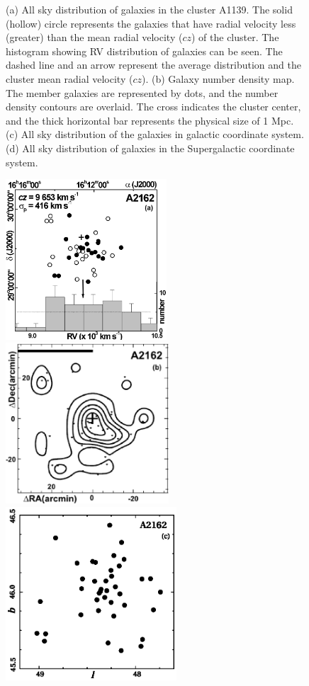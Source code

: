\begin{figure}[H]
   \caption{(a) All sky distribution of galaxies in the cluster A1139. The solid (hollow) circle represents the galaxies that have radial velocity less (greater) than
      the mean radial velocity ($cz$) of the cluster. The histogram showing RV distribution of galaxies can be seen.
      The dashed line and an arrow represent the average distribution and the cluster mean radial velocity ($cz$).
      (b) Galaxy number density map. The member galaxies are represented by dots, and the number density contours are overlaid.
      The cross indicates the cluster center, and the thick horizontal bar represents the physical size of 1 Mpc.
    (c) All sky distribution of the galaxies in galactic coordinate system. (d) All sky distribution of galaxies in the Supergalactic coordinate system.}
\end{figure}
\begin{figure}[H]
\centering
      \includegraphics[height=6.0cm]{fig5a.eps}
   \includegraphics[height=6.0cm]{fig5b.eps}\\
    \includegraphics[height=6.5cm]{gal_a2162.eps}

\end{figure}
